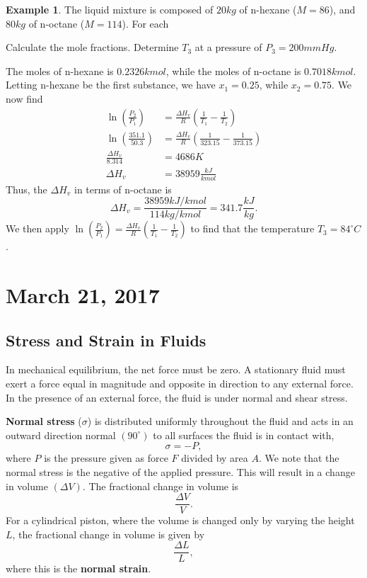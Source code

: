 \documentclass[11pt]{article}
\theoremstyle{plain} %
\theoremstyle{definition}
\theoremstyle{example}
\newtheorem*{example}{Example}
\theoremstyle{remark}
\begin{document}
\begin{example}
The liquid mixture is composed of $20kg$ of n-hexane ($M = 86$), and $80kg$ of n-octane ($M=114$). For each 

Calculate the mole fractions. Determine $T_3$ at a pressure of $P_3 = 200mmHg$. 
\end{example}

The moles of n-hexane is $0.2326kmol$, while the moles of n-octane is $0.7018kmol$. Letting n-hexane be the first substance, we have $x_1 = 0.25$, while $x_2 = 0.75$. We now find 
\begin{align*}
	\ln\left(\frac{P_2}{P_1}\right) &= \frac{\Delta H_v}{R}\left(\frac{1}{T_1}-\frac{1}{T_2}\right)\\
	\ln\left(\frac{351.1}{50.3}\right) &= \frac{\Delta H_v}{R}\left(\frac{1}{323.15}-\frac{1}{373.15}\right)\\
	\frac{\Delta H_v}{8.314} &= 4686K\\
	\Delta H_v &= 38959\frac{kJ}{kmol}
\end{align*}
Thus, the $\Delta H_v$ in terms of n-octane is $$\Delta H_v = \frac{38959kJ/kmol}{114kg/kmol} = 341.7\frac{kJ}{kg}.$$
We then apply $\ln\left(\frac{P_2}{P_1}\right) = \frac{\Delta H_v}{R}\left(\frac{1}{T_1}-\frac{1}{T_2}\right)$ to find that the temperature $T_3= 84^{\circ}C$. 

\section{March 21, 2017}
\subsection{Stress and Strain in Fluids}

In mechanical equilibrium, the net force must be zero. A stationary fluid must exert a force equal in magnitude and opposite in direction to any external force. In the presence of an external force, the fluid is under normal and shear stress. 

\textbf{Normal stress} ($\sigma$) is distributed uniformly throughout the fluid and acts in an outward direction normal $\left(90^{\circ}\right)$ to all surfaces the fluid is in contact with, 
$$\sigma = -P,$$
where $P$ is the pressure given as force $F$ divided by area $A$. We note that the normal stress is the negative of the applied pressure. This will result in a change in volume $(\Delta V)$. The fractional change in volume is 
$$\frac{\Delta V}{V}.$$
For a cylindrical piston, where the volume is changed only by varying the height $L$, the fractional change in volume is given by 
$$\frac{\Delta L}{L},$$
where this is the \textbf{normal strain}. 
\end{document}
